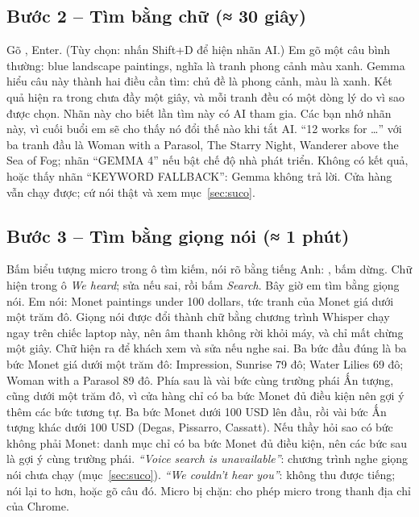 \subsection{Bước 2 -- Tìm bằng chữ \normalfont\small(≈ 30 giây)}
Gõ , Enter. (Tùy chọn: nhấn Shift+D để hiện nhãn AI.)
Em gõ một câu bình thường: blue landscape paintings, nghĩa là tranh phong cảnh màu xanh. Gemma hiểu câu này thành hai điều cần tìm: chủ đề là phong cảnh, màu là xanh. Kết quả hiện ra trong chưa đầy một giây, và mỗi tranh đều có một dòng lý do vì sao được chọn.  Nhãn này cho biết lần tìm này có AI tham gia. Các bạn nhớ nhãn này, vì cuối buổi em sẽ cho thấy nó đổi thế nào khi tắt AI.
``12 works for \ldots'' với ba tranh đầu là Woman with a Parasol, The Starry Night, Wanderer above the Sea of Fog; nhãn ``GEMMA 4'' nếu bật chế độ nhà phát triển.
Không có kết quả, hoặc thấy nhãn ``KEYWORD FALLBACK'': Gemma không trả lời. Cửa hàng vẫn chạy được; cứ nói thật và xem mục~\ref{sec:suco}.

\subsection{Bước 3 -- Tìm bằng giọng nói \normalfont\small(≈ 1 phút)}
Bấm biểu tượng micro trong ô tìm kiếm, nói rõ bằng tiếng Anh: , bấm dừng. Chữ hiện trong ô \emph{We heard}; sửa nếu sai, rồi bấm \emph{Search}.
Bây giờ em tìm bằng giọng nói.  Em nói: Monet paintings under 100 dollars, tức tranh của Monet giá dưới một trăm đô. Giọng nói được đổi thành chữ bằng chương trình Whisper chạy ngay trên chiếc laptop này, nên âm thanh không rời khỏi máy, và chỉ mất chừng một giây. Chữ hiện ra để khách xem và sửa nếu nghe sai.  Ba bức đầu đúng là ba bức Monet giá dưới một trăm đô: Impression, Sunrise 79 đô; Water Lilies 69 đô; Woman with a Parasol 89 đô. Phía sau là vài bức cùng trường phái Ấn tượng, cũng dưới một trăm đô, vì cửa hàng chỉ có ba bức Monet đủ điều kiện nên gợi ý thêm các bức tương tự.
Ba bức Monet dưới 100 USD lên đầu, rồi vài bức Ấn tượng khác dưới 100 USD (Degas, Pissarro, Cassatt). Nếu thầy hỏi sao có bức không phải Monet: danh mục chỉ có ba bức Monet đủ điều kiện, nên các bức sau là gợi ý cùng trường phái.
\emph{``Voice search is unavailable''}: chương trình nghe giọng nói chưa chạy (mục~\ref{sec:suco}). \emph{``We couldn't hear you''}: không thu được tiếng; nói lại to hơn, hoặc gõ câu đó. Micro bị chặn: cho phép micro trong thanh địa chỉ của Chrome.

